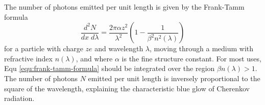 The number of photons emitted per unit length is given by the Frank-Tamm formula
\begin{equation}
\frac{d^2N}{dx\; d\lambda} = \frac{2\pi \alpha z^2}{\lambda^2}\left( 1 - \frac{1}{\beta^2n^2(\lambda)}\right)
\label{equ:frank-tamm-formula}
\end{equation}
for a particle with charge \(ze\) and wavelength \(\lambda\), moving through a medium with refractive index \(n(\lambda)\), and where \(\alpha\) is the fine structure constant.\nolinebreak\cite{Frank_1937}
For most uses, Equ \nolinebreak\ref{equ:frank-tamm-formula} 
should be integrated over the region \(\beta n(\lambda) > 1\). The number of photons \(N\) emitted per unit length is inversely proportional to the square of the wavelength, explaining the characteristic blue glow of Cherenkov radiation.


